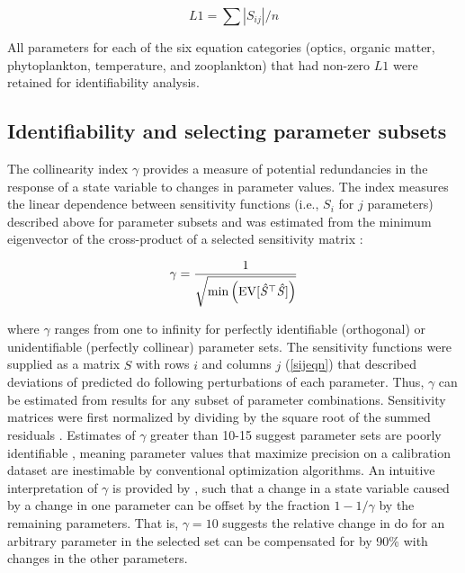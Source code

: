 \documentclass[preprint]{elsarticle}\usepackage[]{graphicx}\usepackage[]{color}
\begin{document}
\begin{equation} \label{l1}
L1 = \sum|S_{ij}|/n
\end{equation}

All parameters for each of the six equation categories (optics, organic matter, phytoplankton, temperature, and zooplankton) that had non-zero $L1$ were retained for identifiability analysis.  

\subsection{Identifiability and selecting parameter subsets}

The collinearity index $\gamma$ provides a measure of potential redundancies in the response of a state variable to changes in parameter values.  The index measures the linear dependence between sensitivity functions (i.e., $S_i$ for $j$ parameters) described above for parameter subsets and was estimated from the minimum eigenvector of the cross-product of a selected sensitivity matrix \citep{Brun01,Omlin01}:

\begin{equation} \label{gameq}
\gamma = \frac{1} {\sqrt{ \min \left(\rm{EV}[\mathit{\hat{S}}^\top \mathit{\hat{S}}]\right)}}
\end{equation}

\noindent where $\gamma$ ranges from one to infinity for perfectly identifiable (orthogonal) or unidentifiable (perfectly collinear) parameter sets.  The sensitivity functions were supplied as a matrix $\hat{S}$ with rows $i$ and columns $j$ (\cref{sijeqn}) that described deviations of predicted \ac{do} following perturbations of each parameter.  Thus, $\gamma$ can be estimated from results for any subset of parameter combinations. Sensitivity matrices were first normalized by dividing by the square root of the summed residuals \citep{Omlin01,Soetaert10}. Estimates of $\gamma$ greater than 10-15 suggest parameter sets are poorly identifiable \citep{Brun01,Omlin01}, meaning parameter values that maximize precision on a calibration dataset are inestimable by conventional optimization algorithms. An intuitive interpretation of $\gamma$ is provided by \citet{Brun01}, such that a change in a state variable caused by a change in one parameter can be offset by the fraction $1 - 1/\gamma$ by the remaining parameters.  That is, $\gamma = 10$ suggests the relative change in \ac{do} for an arbitrary parameter in the selected set can be compensated for by 90\% with changes in the other parameters. 
\end{document}

